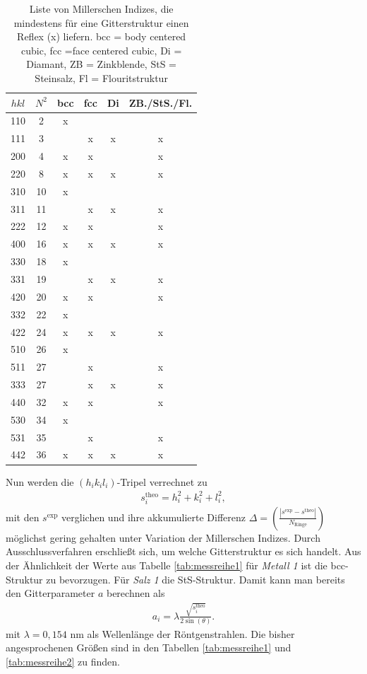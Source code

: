 \begin{table}[t]
\begin{tabular}{cc|cccc}
 $hkl$&$N^2$& bcc & fcc & Di & ZB./StS./Fl.\\
 \hline
 110&2&x&&&\\
 111&3&&x&x&x\\
 200&4&x&x&&x\\
 220&8&x&x&x&x\\
 310&10&x&&&\\
 311&11&&x&x&x\\
 222&12&x&x&&x\\
 400&16&x&x&x&x\\
 330&18&x&&&\\
 331&19&&x&x&x\\
 420&20&x&x&&x\\
 332&22&x&&&\\
 422&24&x&x&x&x\\
 510&26&x&&&\\
 511&27&&x&&x\\
 333&27&&x&x&x\\
 440&32&x&x&&x\\
 530&34&x&&&\\
 531&35&&x&&x\\
 442&36&x&x&x&x\\
\end{tabular}
\caption{Liste von Millerschen Indizes, die mindestens für eine Gitterstruktur einen Reflex (x) liefern. bcc = body centered cubic, fcc =face centered cubic,
 Di = Diamant, ZB = Zinkblende, StS = Steinsalz, Fl = Flouritstruktur}
\label{tab:hklstrukturen}
\end{table}
\noindent  Nun werden die $(h_ik_il_i)$-Tripel
verrechnet zu
\begin{align}
 s^\text{theo}_i = h_i^2 + k_i^2 + l_i^2,
 \label{eq:structTheo}
\end{align}
mit den $s^\text{exp}$ verglichen und ihre akkumulierte Differenz $\Delta=\left(\frac{|s^\text{exp}-s^\text{theo}|}{N_\text{Ringe}}\right)$ möglichst gering gehalten unter Variation der Millerschen Indizes. Durch Ausschlussverfahren 
erschließt sich, um welche Gitterstruktur es sich handelt. Aus der Ähnlichkeit der Werte
aus Tabelle \ref{tab:messreihe1} für \textit{Metall 1} ist die bcc-Struktur zu bevorzugen. Für \textit{Salz 1} die StS-Struktur.
Damit kann man bereits den Gitterparameter $a$ berechnen als
\begin{align}
 a_i = \lambda\frac{\sqrt{s^\text{theo}_i}}{2\sin(\theta)}.
 \label{eq:gitterparameter}
\end{align}
mit $\lambda=0,154$ nm als Wellenlänge der Röntgenstrahlen. Die bisher angesprochenen Größen sind in den Tabellen 
\ref{tab:messreihe1} und \ref{tab:messreihe2} zu finden.

